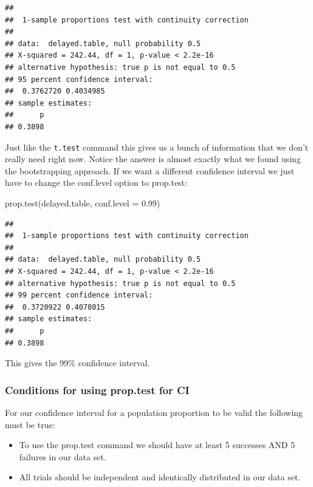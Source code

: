 \documentclass[
]{book}
\newenvironment{Shaded}{\begin{snugshade}}{\end{snugshade}}
\newcommand{\AttributeTok}[1]{\textcolor[rgb]{0.77,0.63,0.00}{#1}}
\newcommand{\FloatTok}[1]{\textcolor[rgb]{0.00,0.00,0.81}{#1}}
\newcommand{\FunctionTok}[1]{\textcolor[rgb]{0.00,0.00,0.00}{#1}}
\newcommand{\NormalTok}[1]{#1}
\providecommand{\tightlist}{%
  \setlength{\itemsep}{0pt}\setlength{\parskip}{0pt}}
\theoremstyle{definition}
\theoremstyle{definition}
\theoremstyle{definition}
\theoremstyle{definition}
\theoremstyle{remark}
\begin{document}
\begin{verbatim}
## 
##  1-sample proportions test with continuity correction
## 
## data:  delayed.table, null probability 0.5
## X-squared = 242.44, df = 1, p-value < 2.2e-16
## alternative hypothesis: true p is not equal to 0.5
## 95 percent confidence interval:
##  0.3762720 0.4034985
## sample estimates:
##      p 
## 0.3898
\end{verbatim}

Just like the \texttt{t.test} command this gives us a bunch of information that we don't really need right now. Notice the answer is almost exactly what we found using the bootstrapping approach. If we want a different confidence interval we just have to change the conf.level option to prop.test:

\begin{Shaded}
\begin{Highlighting}[]
\FunctionTok{prop.test}\NormalTok{(delayed.table, }\AttributeTok{conf.level =} \FloatTok{0.99}\NormalTok{)}
\end{Highlighting}
\end{Shaded}

\begin{verbatim}
## 
##  1-sample proportions test with continuity correction
## 
## data:  delayed.table, null probability 0.5
## X-squared = 242.44, df = 1, p-value < 2.2e-16
## alternative hypothesis: true p is not equal to 0.5
## 99 percent confidence interval:
##  0.3720922 0.4078015
## sample estimates:
##      p 
## 0.3898
\end{verbatim}

This gives the 99\% confidence interval.

\hypertarget{conditions-for-using-prop.test-for-ci}{%
\subsubsection{Conditions for using prop.test for CI}\label{conditions-for-using-prop.test-for-ci}}

For our confidence interval for a population proportion to be valid the following must be true:

\begin{itemize}
\tightlist
\item
  To use the prop.test command we should have at least 5 successes AND 5 failures in our data set.
\item
  All trials should be independent and identically distributed in our data set.
\end{itemize}
\end{document}
